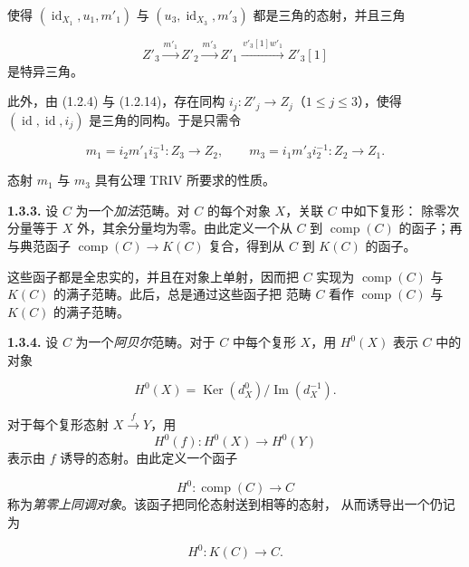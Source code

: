 
\clearpage
{}%
\begingroup
\small
\setlength{\emergencystretch}{1.5em}%
\setlength{\abovedisplayskip}{4pt plus 2pt minus 2pt}%
\setlength{\belowdisplayskip}{4pt plus 2pt minus 2pt}%

\noindent 使得 $(\operatorname{id}_{X_1},u_1,m'_1)$ 与
$(u_3,\operatorname{id}_{X_3},m'_3)$ 都是三角的态射，并且三角

\[
  Z'_3\xrightarrow{m'_1}Z'_2\xrightarrow{m'_3}Z'_1
  \xrightarrow{\,v'_3[1]w'_1\,}Z'_3[1]
\]
\noindent 是特异三角。

此外，由 (1.2.4) 与 (1.2.14)，存在同构
$i_j\colon Z'_j\longrightarrow Z_j$（$1\leq j\leq 3$），使得
$(\operatorname{id},\operatorname{id},i_j)$ 是三角的同构。于是只需令

\[
  m_1=i_2m'_1i_3^{-1}\colon Z_3\longrightarrow Z_2,
  \qquad
  m_3=i_1m'_3i_2^{-1}\colon Z_2\longrightarrow Z_1.
\]

态射 $m_1$ 与 $m_3$ 具有公理 TRIV 所要求的性质。

\medskip
\noindent\textbf{1.3.3.}\quad
设 $C$ 为一个\emph{加法}范畴。对 $C$ 的每个对象 $X$，关联 $C$ 中如下复形：
除零次分量等于 $X$ 外，其余分量均为零。由此定义一个从 $C$ 到
$\operatorname{comp}(C)$ 的函子；再与典范函子
$\operatorname{comp}(C)\longrightarrow K(C)$ 复合，得到从 $C$ 到 $K(C)$
的函子。

这些函子都是全忠实的，并且在对象上单射，因而把 $C$ 实现为
$\operatorname{comp}(C)$ 与 $K(C)$ 的满子范畴。此后，总是通过这些函子把
范畴 $C$ 看作 $\operatorname{comp}(C)$ 与 $K(C)$ 的满子范畴。

\medskip
\noindent\textbf{1.3.4.}\quad
设 $C$ 为一个\emph{阿贝尔}范畴。对于 $C$ 中每个复形 $X$，用 $H^0(X)$
表示 $C$ 中的对象

\[
  H^0(X)=\operatorname{Ker}(d_X^0)/\operatorname{Im}(d_X^{-1}).
  \tag{1.3.4.1}
\]

对于每个复形态射 $X\xrightarrow{f}Y$，用
\[
  H^0(f)\colon H^0(X)\longrightarrow H^0(Y)
\]
\noindent 表示由 $f$ 诱导的态射。由此定义一个函子

\[
  H^0\colon\operatorname{comp}(C)\longrightarrow C
\]
\noindent 称为\emph{第零上同调对象}。该函子把同伦态射送到相等的态射，
从而诱导出一个仍记为

\[
  H^0\colon K(C)\longrightarrow C.
\]
\endgroup


